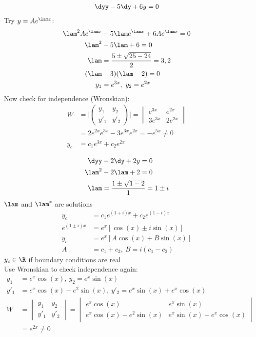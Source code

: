 \documentclass[Maths.tex]{subfiles}
\begin{document}
\begin{example}
\begin{align}
    \dyy - 5\dy + 6y = 0
\end{align}
Try $y = Ae^{\lam x}$:
\begin{align}
    \lam^2 Ae^{\lam x} &- 5\lam e^{\lam x} + 6Ae^{\lam x} = 0 \\
    \lam^2 &- 5\lam + 6 = 0 \\
    \lam &= \frac{5 \pm \sqrt{25 - 24}}{2} = 3,2 \\
    (\lam &- 3)(\lam - 2) = 0 \\
    y_1 &= e^{3x},~ y_2 = e^{2x}
\end{align}
Now check for independence (Wronskian):
\begin{align}
    W &= \Bigg|\begin{pmatrix} y_1 & y_2 \\ y'_1 & y'_2 \end{pmatrix}\Bigg| = \begin{vmatrix} e^{3x} & e^{2x} \\ 3e^{3x} & 2e^{2x} \end{vmatrix} \\
    &= 2e^{2x}e^{3x} - 3e^{3x}e^{2x} = -e^{5x} \neq 0 \\
    y_c &= c_1 e^{3x} + c_2 e^{2x}
\end{align}
\end{example}

\begin{example}
\begin{align}
    \dyy &- 2\dy + 2y = 0 \\
    \lam^2 &- 2\lam + 2 = 0 \\
    \lam &= \frac{1 \pm \sqrt{1 - 2}}{1} = 1 \pm i
\end{align}
$\lam$ and $\lam^*$ are solutions
\begin{align}
    y_c &= c_1 e^{(1 + i)x} + c_2 e^{(1 - i)x} \\
    e^{(1 \pm i)x} &= e^x [\cos(x) \pm i\sin(x)] \\
    y_c &= e^x [A\cos(x) + B\sin(x)] \\
    A &= c_1 + c_2, ~ B = i(c_1 - c_2)
\end{align}
$y_c \in \R$ if boundary conditions are real \\
Use Wronskian to check independence again:
\begin{align}
    y_1 &= e^x \cos(x), ~ y_2 = e^x \sin(x) \\
    y'_1 &= e^x\cos(x) - e^2\sin(x), ~ y'_2 = e^x\sin(x) + e^x\cos(x) \\
    W &= \begin{vmatrix} y_1 & y_2 \\ y'_1 & y'_2 \end{vmatrix} = \begin{vmatrix} e^x \cos(x) & e^x \sin(x) \\ e^x\cos(x) - e^2\sin(x) & e^x\sin(x) + e^x\cos(x) \end{vmatrix} \\
    &= e^{2x} \neq 0
\end{align}
\end{example}
\end{document}
